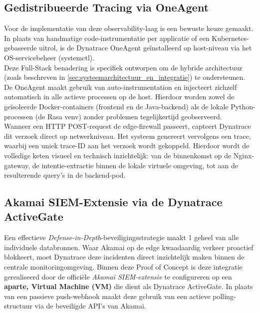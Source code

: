 \subsection{Gedistribueerde Tracing via OneAgent}
\label{sec:gedistribueerde_tracing_via_oneagent}

Voor de implementatie van deze observability-laag is een bewuste keuze gemaakt. In plaats van handmatige code-instrumentatie per applicatie of een Kubernetes-gebaseerde uitrol, is de Dynatrace OneAgent geïnstalleerd op host-niveau via het OS-servicebeheer (systemctl).\\

Deze Full-Stack benadering is specifiek ontworpen om de hybride architectuur (zoals beschreven in \ref{sec:systeemarchitectuur_en_integratie}) te ondersteunen. De OneAgent maakt gebruik van auto-instrumentation en injecteert zichzelf automatisch in alle actieve processen op de host. Hierdoor worden zowel de geïsoleerde Docker-containers (frontend en de Java-backend) als de lokale Python-processen (de Rasa venv) zonder problemen tegelijkertijd geobserveerd.\\

Wanneer een HTTP POST-request de edge-firewall passeert, capteert Dynatrace dit verzoek direct op netwerkniveau. Het systeem genereert vervolgens een trace, waarbij een uniek trace-ID aan het verzoek wordt gekoppeld. Hierdoor wordt de volledige keten visueel en technisch inzichtelijk: van de binnenkomst op de Nginx-gateway, de intentie-extractie binnen de lokale virtuele omgeving, tot aan de resulterende query's in de backend-pod.

\subsection{Akamai SIEM-Extensie via de Dynatrace ActiveGate}
\label{sec:akamai_siem_extensie_via_dynatrace_activegate}

Een effectieve \textit{Defense-in-Depth}-beveiligingsstrategie maakt 1 geheel van alle individuele databronnen. Waar Akamai op de edge kwaadaardig verkeer proactief blokkeert, moet Dynatrace deze incidenten direct inzichtelijk maken binnen de centrale monitoringomgeving. Binnen deze Proof of Concept is deze integratie gerealiseerd door de officiële \textit{Akamai SIEM-extensie} te configureren op een \textbf{aparte, Virtual Machine (VM)} die dient als Dynatrace ActiveGate. In plaats van een passieve push-webhook maakt deze gebruik van een actieve polling-structuur via de beveiligde API's van Akamai.

